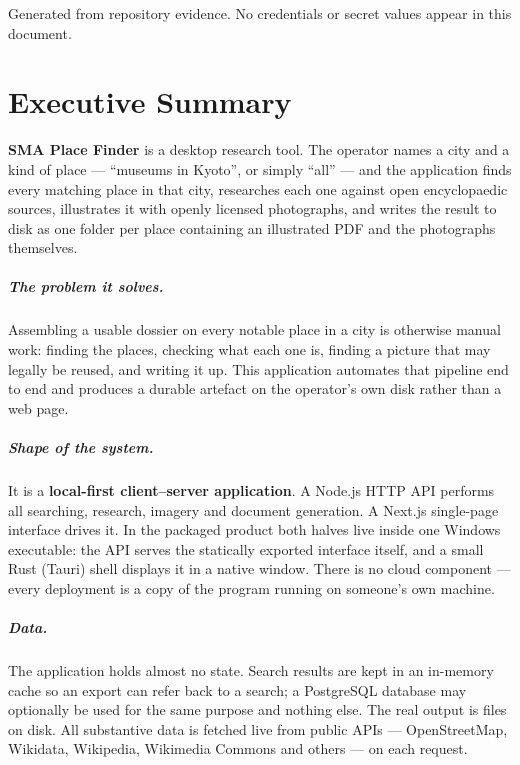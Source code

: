 \documentclass[11pt,a4paper]{report}
\begin{document}
\begin{titlepage}
\vfill
{\footnotesize Generated from repository evidence. No credentials or secret values appear in this document.}
\end{titlepage}

\tableofcontents
\listoffigures
\listoftables
\clearpage

\chapter{Executive Summary}
\label{sec:exec}

\textbf{SMA Place Finder} is a desktop research tool. The operator names a city
and a kind of place --- ``museums in Kyoto'', or simply ``all'' --- and the
application finds every matching place in that city, researches each one against
open encyclopaedic sources, illustrates it with openly licensed photographs, and
writes the result to disk as one folder per place containing an illustrated PDF
and the photographs themselves.

\paragraph{The problem it solves.} Assembling a usable dossier on every notable
place in a city is otherwise manual work: finding the places, checking what each
one is, finding a picture that may legally be reused, and writing it up. This
application automates that pipeline end to end and produces a durable artefact
on the operator's own disk rather than a web page.

\paragraph{Shape of the system.} It is a \textbf{local-first client--server
application}. A Node.js HTTP API performs all searching, research, imagery and
document generation. A Next.js single-page interface drives it. In the packaged
product both halves live inside one Windows executable: the API serves the
statically exported interface itself, and a small Rust (Tauri) shell displays it
in a native window. There is no cloud component --- every deployment is a copy of
the program running on someone's own machine.

\paragraph{Data.} The application holds almost no state. Search results are kept
in an in-memory cache so an export can refer back to a search; a PostgreSQL
database may optionally be used for the same purpose and nothing else. The real
output is files on disk. All substantive data is fetched live from public APIs
--- OpenStreetMap, Wikidata, Wikipedia, Wikimedia Commons and others --- on each
request.
\end{document}
